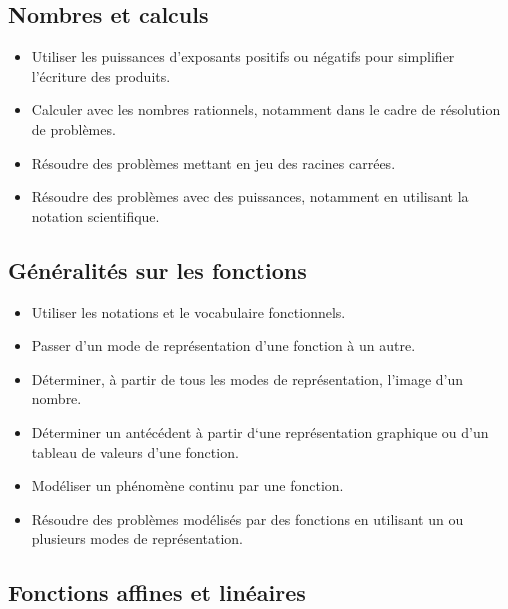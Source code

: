 \documentclass[a4paper,12pt,fleqn]{article}
\begin{document}
\subsection*{Nombres et calculs}

\begin{itemize}
	\item {}Utiliser les puissances d’exposants positifs ou négatifs pour simplifier l’écriture des produits.
	\item {}Calculer avec les nombres rationnels, notamment dans le cadre de résolution de problèmes.
	\item {}Résoudre des problèmes mettant en jeu des racines carrées.
	\item {}Résoudre des problèmes avec des puissances, notamment en utilisant la notation scientifique.
\end{itemize}


\newpage


\subsection*{Généralités sur les fonctions}

\begin{itemize}
	\item {}Utiliser les notations et le vocabulaire fonctionnels.
	\item {}Passer d’un mode de représentation d’une fonction à un autre.
	\item {}Déterminer, à partir de tous les modes de représentation, l’image d’un nombre.
	\item {}Déterminer un antécédent à partir d‘une représentation graphique ou d’un tableau de valeurs d’une fonction.
	\item {}Modéliser un phénomène continu par une fonction.
	\item {}Résoudre des problèmes modélisés par des fonctions en utilisant un ou plusieurs modes de représentation.
\end{itemize}

\subsection*{Fonctions affines et linéaires}
\end{document}
